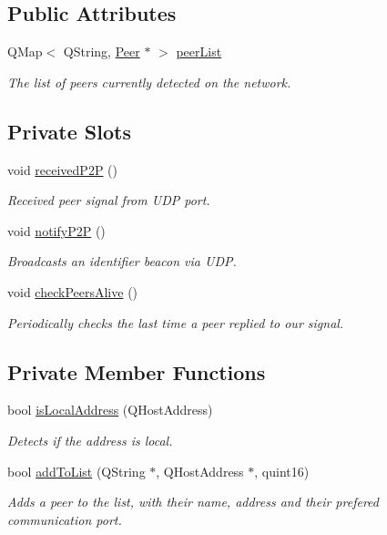 \subsection*{\-Public \-Attributes}
\begin{DoxyCompactItemize}
\item 
\-Q\-Map$<$ \-Q\-String, \hyperlink{class_peer}{\-Peer} $\ast$ $>$ \hyperlink{class_network_discover_ac7f0c8a7a8e780c83c24b4fa8cbbbfef}{peer\-List}
\begin{DoxyCompactList}\small\item\em \-The list of peers currently detected on the network. \end{DoxyCompactList}\end{DoxyCompactItemize}
\subsection*{\-Private \-Slots}
\begin{DoxyCompactItemize}
\item 
void \hyperlink{class_network_discover_ada902f88ce4d9b1e707dfbf1be3e102c}{received\-P2\-P} ()
\begin{DoxyCompactList}\small\item\em \-Received peer signal from \-U\-D\-P port. \end{DoxyCompactList}\item 
void \hyperlink{class_network_discover_ac9c9e8988abe75fb02386b7783cf53be}{notify\-P2\-P} ()
\begin{DoxyCompactList}\small\item\em \-Broadcasts an identifier beacon via \-U\-D\-P. \end{DoxyCompactList}\item 
void \hyperlink{class_network_discover_aec820bf7bae99a2a8f533bb31a841ca6}{check\-Peers\-Alive} ()
\begin{DoxyCompactList}\small\item\em \-Periodically checks the last time a peer replied to our signal. \end{DoxyCompactList}\end{DoxyCompactItemize}
\subsection*{\-Private \-Member \-Functions}
\begin{DoxyCompactItemize}
\item 
bool \hyperlink{class_network_discover_ab1909b31fd4df24ebe095d3bbde3925e}{is\-Local\-Address} (\-Q\-Host\-Address)
\begin{DoxyCompactList}\small\item\em \-Detects if the address is local. \end{DoxyCompactList}\item 
bool \hyperlink{class_network_discover_a8e567964d959ba269d2570769eb7b1da}{add\-To\-List} (\-Q\-String $\ast$, \-Q\-Host\-Address $\ast$, quint16)
\begin{DoxyCompactList}\small\item\em \-Adds a peer to the list, with their name, address and their prefered communication port. \end{DoxyCompactList}\end{DoxyCompactItemize}
